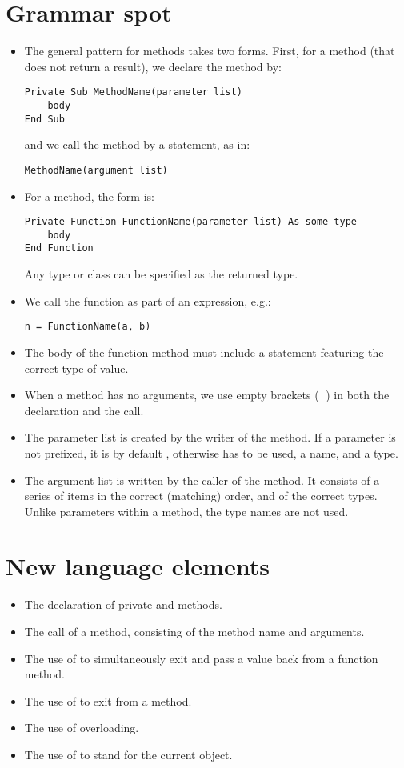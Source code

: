 	\section{Grammar spot}
		\begin{itemize}
			\item The general pattern for methods takes two forms. First, for a  method (that does not return a result), we declare the method by:
				\begin{lstlisting}
Private Sub MethodName(parameter list)
	body
End Sub
				\end{lstlisting}
				and we call the method by a statement, as in:
				\begin{lstlisting}
MethodName(argument list)
				\end{lstlisting}
			\item For a  method, the form is:
				\begin{lstlisting}
Private Function FunctionName(parameter list) As some type
	body
End Function
				\end{lstlisting}
				Any type or class can be specified as the returned type.
			\item We call the function as part of an expression, e.g.:
				\begin{lstlisting}
n = FunctionName(a, b)
				\end{lstlisting}
			\item The body of the function method must include a  statement featuring the correct type of value.
			\item When a method has no arguments, we use empty brackets (  ) in both the declaration and the call.
			\item The parameter list is created by the writer of the method. If a parameter is not prefixed, it is by default , otherwise  has to be used, a name, and a type.
			\item The argument list is written by the caller of the method. It consists of a series of items in the correct (matching) order, and of the correct types. Unlike parameters within a method, the type names are not used.
		\end{itemize}

		
	\section{New language elements}
		\begin{itemize}
			\item The declaration of private  and  methods.
			\item The call of a method, consisting of the method name and arguments.
			\item The use of  to simultaneously exit and pass a value back from a function method.
			\item The use of  to exit from a  method.
			\item The use of overloading.
			\item The use of  to stand for the current object.
		\end{itemize}


